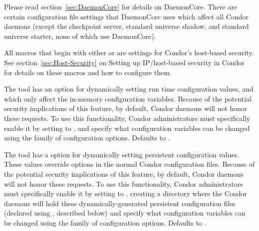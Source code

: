 Please read section~\ref{sec:DaemonCore} for details
on DaemonCore.  There are certain configuration file settings that
DaemonCore uses which affect all Condor daemons (except the checkpoint
server, standard universe shadow, and standard universe starter, none of
which use DaemonCore).
\begin{description}

\label{param:HostAllow}
\item[\Macro{HOSTALLOW\Dots}]
  All macros that begin with either  or
   are settings for Condor's host-based security.
  See section~\ref{sec:Host-Security} on Setting up
  IP/host-based security in Condor for details on these
  macros and how to configure them.

\label{param:EnableRuntimeConfig}
\item[\Macro{ENABLE\_RUNTIME\_CONFIG}]
  The  tool has an option  for
  dynamically setting run time configuration values, and which only affect
  the in-memory configuration variables.
  Because of the potential security implications of this feature, by
  default, Condor daemons will not honor these requests.
  To use this functionality, Condor administrators must specifically
  enable it by setting  to , and
  specify what configuration variables can be changed using the
   family of configuration options.
  Defaults to .

\label{param:EnablePersistentConfig}
\item[\Macro{ENABLE\_PERSISTENT\_CONFIG}]
  The  tool has a  option for
  dynamically setting persistent configuration values.
  These values override options in the normal Condor configuration
  files.
  Because of the potential security implications of this feature, by
  default, Condor daemons will not honor these requests.
  To use this functionality, Condor administrators must specifically
  enable it by setting  to ,
  creating a directory where the Condor daemons will hold these
  dynamically-generated persistent configuration files (declared using
  , described below) and specify what
  configuration variables can be changed using the
   family of configuration options.
  Defaults to .


\end{description}
